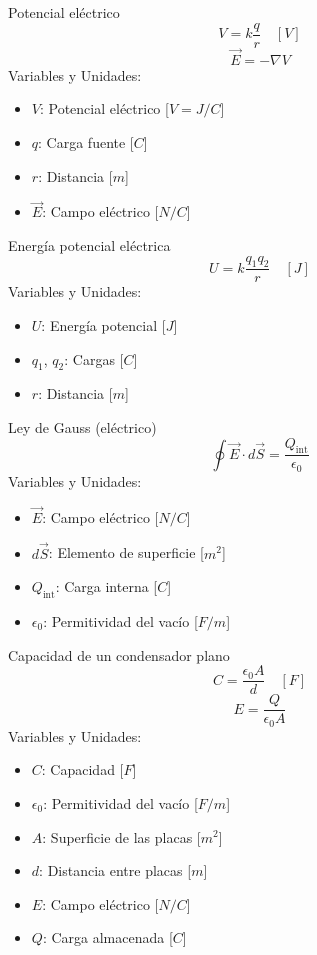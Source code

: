 \begin{landscape}
\begin{multicols}{3}
\begin{teorema}{Potencial eléctrico}
    $$V = k\frac{q}{r} \quad [V]$$
    $$\vec{E} = -\nabla V$$
    Variables y Unidades:
    \begin{itemize}
        \item $V$: Potencial eléctrico [$V = J/C$]
        \item $q$: Carga fuente [$C$]
        \item $r$: Distancia [$m$]
        \item $\vec{E}$: Campo eléctrico [$N/C$]
    \end{itemize}
\end{teorema}

\begin{teorema}{Energía potencial eléctrica}
    $$U = k\frac{q_1 q_2}{r} \quad [J]$$
    Variables y Unidades:
    \begin{itemize}
        \item $U$: Energía potencial [$J$]
        \item $q_1$, $q_2$: Cargas [$C$]
        \item $r$: Distancia [$m$]
    \end{itemize}
\end{teorema}

\columnbreak

\begin{teorema}{Ley de Gauss (eléctrico)}
    $$\oint \vec{E} \cdot d\vec{S} = \frac{Q_{\text{int}}}{\epsilon_0}$$
    Variables y Unidades:
    \begin{itemize}
        \item $\vec{E}$: Campo eléctrico [$N/C$]
        \item $d\vec{S}$: Elemento de superficie [$m^2$]
        \item $Q_{\text{int}}$: Carga interna [$C$]
        \item $\epsilon_0$: Permitividad del vacío [$F/m$]
    \end{itemize}
\end{teorema}

\begin{teorema}{Capacidad de un condensador plano}
    $$C = \frac{\epsilon_0 A}{d} \quad [F]$$
    $$E = \frac{Q}{\epsilon_0 A}$$
    Variables y Unidades:
    \begin{itemize}
        \item $C$: Capacidad [$F$]
        \item $\epsilon_0$: Permitividad del vacío [$F/m$]
        \item $A$: Superficie de las placas [$m^2$]
        \item $d$: Distancia entre placas [$m$]
        \item $E$: Campo eléctrico [$N/C$]
        \item $Q$: Carga almacenada [$C$]
    \end{itemize}
\end{teorema}


\end{multicols}
\end{landscape}

